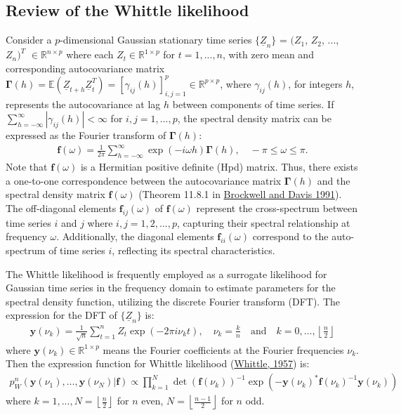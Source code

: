 \documentclass[12pt,a4paper]{article}
\begin{document}
\subsection{Review of the Whittle likelihood}
\label{whittle}
Consider a $p$-dimensional Gaussian stationary time series $\{\underline Z_{n}\}$ = $(Z_{1}$, $Z_{2}$, ..., $Z_{n})^T$ $\in \mathbb{R}^{n\times p}$ where each $Z_{t}\in \mathbb{R}^{1\times p}$ for $t=1,...,n$, with zero mean and corresponding autocovariance matrix $\mathbf{\Gamma}(h)=\mathbb{E}(\underline{Z}_{t+h} \underline{Z}_{t}^T)=[\gamma_{ij}(h)]_{i,j=1}^p \in \mathbb{R}^{p\times p}$, where $\gamma_{ij}(h)$, for integers $h$, represents the autocovariance at lag $h$ between components of time series. If $\sum_{h=-\infty}^{\infty}|\gamma_{ij}(h)|< \infty$ for $i, j=1, ..., p$, the spectral density matrix can be expressed as the Fourier transform of $\mathbf{\Gamma}(h)$:
\begin{align}
\bm{f}(\omega) = \frac{1}{2\pi}\sum_{h=-\infty}^{\infty} \exp(-i\omega h) \mathbf{\Gamma}(h), \quad -\pi \leq \omega\leq\pi.
\end{align}
Note that $\bm{f}(\omega)$ is a Hermitian positive definite (Hpd) matrix. Thus, there exists a one-to-one correspondence between the autocovariance matrix $\mathbf{\Gamma}(h)$ and the spectral density matrix $\bm{f}(\omega)$ (Theorem 11.8.1 in \hyperref[BD1991]{Brockwell and Davis 1991}). The off-diagonal elements $\bm{f}_{ij}(\omega)$ of $\bm{f}(\omega)$ represent the cross-spectrum between time series $i$ and $j$ where $i,j = 1, 2, ..., p$, capturing their spectral relationship at frequency $\omega$. Additionally, the diagonal elements $\bm{f}_{ii}(\omega)$ correspond to the auto-spectrum of time series $i$, reflecting its spectral characteristics.

The Whittle likelihood is frequently employed as a surrogate likelihood for Gaussian time series in the frequency domain to estimate parameters for the spectral density function, utilizing the discrete Fourier transform (DFT). The expression for the DFT of $\{\underline{Z}_{n}\}$ is:
\begin{align}
\mathbf{y}(\nu_k) = \frac{1}{\sqrt{n}} \sum_{t=1}^{n} Z_t\exp(-2\pi i\nu_k t), \quad \nu_k = \frac{k}{n} 
\quad \text{and} \quad k = 0, \ldots, \left\lfloor \frac{n}{2}\right\rfloor
\end{align}
where $\mathbf{y}(\nu_k) \in \mathbb{R}^{1\times p}$ means the Fourier coefficients at the Fourier frequencies $\nu_k$.
Then the expression function for Whittle likelihood (\hyperref[whittle]{Whittle, 1957}) is:
\begin{align}
p^{n}_W(\mathbf{y}(\nu_1), \ldots, \mathbf{y}(\nu_N)| \bm{f}) 
\propto \prod_{k=1}^{N} \det(\bm{f}(\nu_k))^{-1} \exp\left(-\mathbf{y}(\nu_k)^* \bm{f}(\nu_k)^{-1} \mathbf{y}(\nu_k)\right)
\end{align}
where $k = 1, ..., N = \left\lfloor \frac{n}{2} \right\rfloor$ for $n$ even, $N = \left\lfloor \frac{n-1}{2} \right\rfloor$ for $n$ odd.
\end{document}
